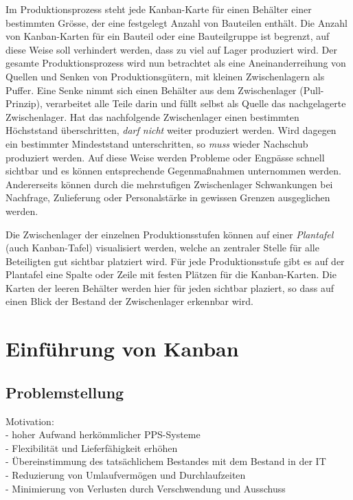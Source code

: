 Im Produktionsprozess steht jede Kanban-Karte für einen Behälter einer bestimmten Grösse, der eine festgelegt Anzahl von Bauteilen enthält.
Die Anzahl von Kanban-Karten für ein Bauteil oder eine Bauteilgruppe ist begrenzt, auf diese Weise soll verhindert werden, dass zu viel auf Lager produziert wird.
Der gesamte Produktionsprozess wird nun betrachtet als eine Aneinanderreihung von Quellen und Senken von Produktionsgütern, mit kleinen Zwischenlagern als Puffer.
Eine Senke nimmt sich einen Behälter aus dem Zwischenlager (Pull-Prinzip), verarbeitet alle Teile darin und füllt selbst als Quelle das nachgelagerte Zwischenlager.
Hat das nachfolgende Zwischenlager einen bestimmten Höchststand überschritten, \emph{darf nicht} weiter produziert werden.
Wird dagegen ein bestimmter Mindeststand unterschritten, so \emph{muss} wieder Nachschub produziert werden.
Auf diese Weise werden Probleme oder Engpässe schnell sichtbar und es können entsprechende Gegenmaßnahmen unternommen werden.
Andererseits können durch die mehrstufigen Zwischenlager Schwankungen bei Nachfrage, Zulieferung oder Personalstärke in gewissen Grenzen ausgeglichen werden.

Die Zwischenlager der einzelnen Produktionsstufen können auf einer \emph{Plantafel} (auch Kanban-Tafel) visualisiert werden, welche an zentraler Stelle für alle Beteiligten gut sichtbar platziert wird.
Für jede Produktionsstufe gibt es auf der Plantafel eine Spalte oder Zeile mit festen Plätzen für die Kanban-Karten.
Die Karten der leeren Behälter werden hier für jeden sichtbar plaziert, so dass auf einen Blick der Bestand der Zwischenlager erkennbar wird.


\section{Einführung von Kanban}
\subsection{Problemstellung}
Motivation: \\
- hoher Aufwand herkömmlicher PPS-Systeme\\
- Flexibilität und Lieferfähigkeit erhöhen\\
- Übereinstimmung des tatsächlichem Bestandes mit dem Bestand in der IT\\
- Reduzierung von Umlaufvermögen und Durchlaufzeiten\\
- Minimierung von Verlusten durch Verschwendung und Ausschuss\\
